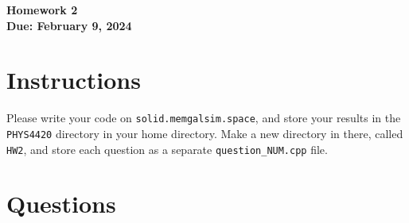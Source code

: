 \documentclass[11pt]{article}
\begin{document}
\begin{center}
\textbf{\Large Homework 2}\\
\textbf{Due: February 9, 2024}\\
\end{center}
\section*{Instructions}
Please write your code on \texttt{solid.memgalsim.space}, and store your results
in the \texttt{PHYS4420} directory in your home directory.  Make a new directory in there, called \texttt{HW2}, and 
store each question as a separate \texttt{question\_NUM.cpp} file.
\section*{Questions}
\end{document}
